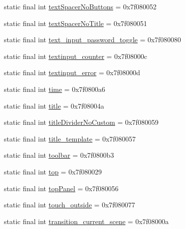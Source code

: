 \begin{CompactItemize}
\item 
static final int \hyperlink{classandroid_1_1support_1_1v7_1_1appcompat_1_1_r_1_1id_c8d080d7b375bebb57eb916ae6cfbd99}{textSpacerNoButtons} = 0x7f080052
\item 
static final int \hyperlink{classandroid_1_1support_1_1v7_1_1appcompat_1_1_r_1_1id_5a7e23765f000b6b1c938616914503ab}{textSpacerNoTitle} = 0x7f080051
\item 
static final int \hyperlink{classandroid_1_1support_1_1v7_1_1appcompat_1_1_r_1_1id_e259ceee8b66a9c76b1679520721cbf9}{text\_\-input\_\-password\_\-toggle} = 0x7f080080
\item 
static final int \hyperlink{classandroid_1_1support_1_1v7_1_1appcompat_1_1_r_1_1id_9cbe580cd26efa00d1d94d73f3eb24ab}{textinput\_\-counter} = 0x7f08000c
\item 
static final int \hyperlink{classandroid_1_1support_1_1v7_1_1appcompat_1_1_r_1_1id_dc637544ff02fe35443be2cabd8593c7}{textinput\_\-error} = 0x7f08000d
\item 
static final int \hyperlink{classandroid_1_1support_1_1v7_1_1appcompat_1_1_r_1_1id_260dfdef0e8e961b031ef9297607ccbf}{time} = 0x7f0800a6
\item 
static final int \hyperlink{classandroid_1_1support_1_1v7_1_1appcompat_1_1_r_1_1id_3320d83e67bee02a082d00a9a83bfd22}{title} = 0x7f08004a
\item 
static final int \hyperlink{classandroid_1_1support_1_1v7_1_1appcompat_1_1_r_1_1id_13498a9d9d84e712885a91c75111fc8f}{titleDividerNoCustom} = 0x7f080059
\item 
static final int \hyperlink{classandroid_1_1support_1_1v7_1_1appcompat_1_1_r_1_1id_1921263c9481ab32791e642754c3f48b}{title\_\-template} = 0x7f080057
\item 
static final int \hyperlink{classandroid_1_1support_1_1v7_1_1appcompat_1_1_r_1_1id_1f100f315da3e672d3b475abd9c8b3a8}{toolbar} = 0x7f0800b3
\item 
static final int \hyperlink{classandroid_1_1support_1_1v7_1_1appcompat_1_1_r_1_1id_2e1b4beea6d1f8c129843a5597c4ab3a}{top} = 0x7f080029
\item 
static final int \hyperlink{classandroid_1_1support_1_1v7_1_1appcompat_1_1_r_1_1id_0867a7d8e02b3b09e3768677786c2154}{topPanel} = 0x7f080056
\item 
static final int \hyperlink{classandroid_1_1support_1_1v7_1_1appcompat_1_1_r_1_1id_fb65812910a8a84c3257820c30bc804a}{touch\_\-outside} = 0x7f080077
\item 
static final int \hyperlink{classandroid_1_1support_1_1v7_1_1appcompat_1_1_r_1_1id_a9a0f4fe26c928c008dfd5a0975f5243}{transition\_\-current\_\-scene} = 0x7f08000a

\end{CompactItemize}
